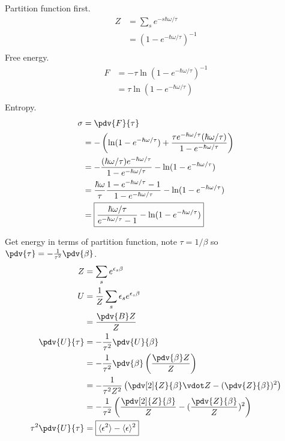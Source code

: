 \documentclass[newpage]{homework}
\begin{document}
\question
Partition function first.
\begin{align*}
    Z   &=	\sum_s e^{-s\hbar \omega / \tau}	\\
        &=	(1 - e^{-\hbar \omega / \tau})^{-1}	\\
\end{align*}
Free energy.
\begin{align*}
    F	&=	-\tau \ln (1 - e^{-\hbar \omega / \tau})^{-1}	\\
        &=	\boxed{\tau \ln (1 - e^{-\hbar \omega / \tau})}	\\
\end{align*}
Entropy.
\begin{align*}
    \sigma	&=	\pdv{F}{\tau}	\\
        &=	-\left( \ln (1 - e^{-\hbar \omega / \tau}) + \frac{\tau e^{-\hbar \omega / \tau} (\hbar \omega / \tau) }{1 - e^{-\hbar \omega / \tau}} \right)	\\
        &=	-\frac{(\hbar \omega / \tau) e^{-\hbar \omega / \tau} }{1 - e^{-\hbar \omega / \tau}} - \ln (1 - e^{-\hbar \omega / \tau})	\\
        &=	\frac{\hbar \omega}{\tau} \frac{1 - e^{-\hbar \omega / \tau} - 1}{1 - e^{-\hbar \omega / \tau}} - \ln (1 - e^{-\hbar \omega / \tau})	\\
        &=	\boxed{\frac{\hbar \omega / \tau}{e^{-\hbar \omega / \tau} - 1} - \ln (1 - e^{-\hbar \omega / \tau})}	\\
\end{align*}


\question
Get energy in terms of partition function, note $\tau = 1/\beta$ so $\pdv{\tau} = -\frac{1}{\tau^2} \pdv{\beta}$.
\begin{align*}
    Z	&=	\sum_s e^{\epsilon_s \beta}	\\
    U   &=	\frac{1}{Z} \sum_s \epsilon_s	e^{\epsilon_s \beta}    \\
        &=	\frac{\pdv{B} Z }{Z}	\\
    \pdv{U}{\tau}    &=	-\frac{1}{\tau^2} \pdv{U}{\beta}	\\
        &=	-\frac{1}{\tau^2} \pdv{\beta} \left(\frac{\pdv{\beta} Z }{Z}\right)	\\
        &=	-\frac{1}{\tau^2 Z^2} \left(\pdv[2]{Z}{\beta} \vdot Z - (\pdv{Z}{\beta})^2 \right)	\\
        &=	-\frac{1}{\tau^2} \left(\frac{\pdv[2]{Z}{\beta}}{Z} - (\frac{\pdv{Z}{\beta}}{Z})^2 \right)	\\
    \tau^2 \pdv{U}{\tau}    &=  \boxed{\langle \epsilon^2 \rangle - \langle \epsilon \rangle^2}\\
\end{align*}
\end{document}

